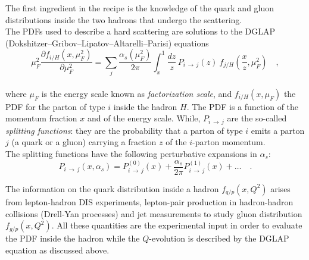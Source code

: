 The first ingredient in the recipe is the knowledge of the quark and gluon distributions inside the two hadrons that undergo the scattering. 
\\
The PDFs used to describe a hard scattering are solutions to the DGLAP (Dokshitzer–Gribov–Lipatov–Altarelli–Parisi) equations \cite{Lipatov:400357, Gribov:427157, ALTARELLI1977298, Dokshitzer:1977sg}
\\
\begin{equation}
	\mu_F^2\frac{\partial f_{i/H}(x,\mu_F^2)}{\partial\mu_F^2}=\displaystyle\sum_j\frac{\alpha_s(\mu_F^2)}{2\pi}\displaystyle\int_x^1 \frac{dz}{z}\, P_{i\,\rightarrow\,j}(z)\ f_{j/H}\left(\frac{x}{z},\mu_F^2\right)\quad ,
\end{equation}
\\
where $\mu_F$ is the energy scale known as  \textit{factorization scale}, and $f_{i/H}(x,\mu_F)$ the PDF for the parton of type $i$ inside the hadron $H$. The PDF is a function of the momentum fraction $x$ and of the energy scale.
While, $P_{i\,\rightarrow\,j}$ are the so-called \textit{splitting functions}: they are the probability that a parton of type $i$ emits a parton $j$ (a quark or a gluon) carrying a fraction $z$ of the $i$-parton momentum.
\\
The splitting functions have the following perturbative expansions in $\alpha_s$: 
\begin{equation}
	P_{i\,\rightarrow\,j}(x,\alpha_s)=P_{i\,\rightarrow\,j}^{(0)}(x)+\frac{\alpha_s}{2\pi}P_{i\,\rightarrow\,j}^{(1)}(x)+\dots\quad .
\end{equation}


The information on the quark distribution inside a hadron $f_{q/p}(x,Q^2)$ arises from lepton-hadron DIS experiments, lepton-pair production in hadron-hadron collisions (Drell-Yan processes) and jet measurements to study gluon distribution $f_{g/p}(x,Q^2)$. All these quantities are the experimental input in order to evaluate the PDF inside the hadron while the $Q$-evolution is described by the DGLAP equation as discussed above.



